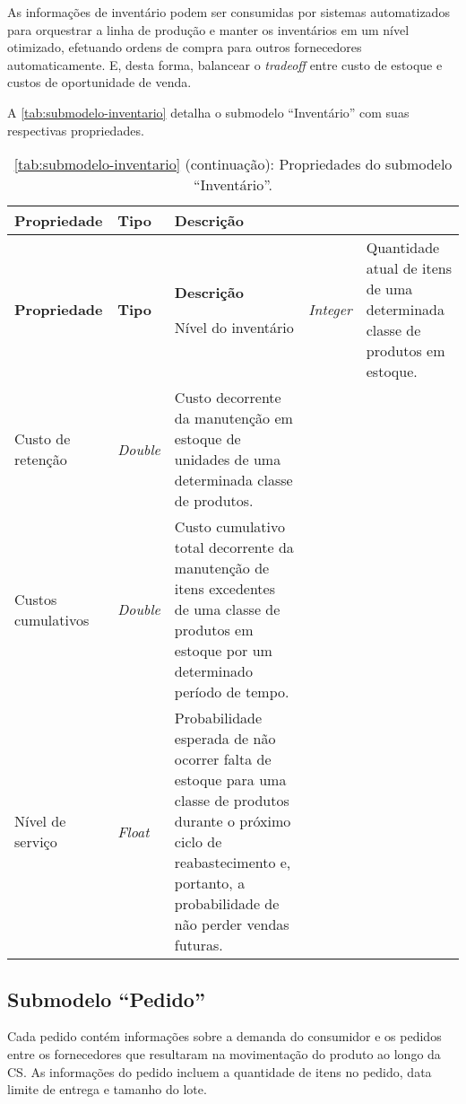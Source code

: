 As informações de inventário podem ser consumidas por sistemas automatizados para orquestrar a linha de produção e manter os inventários em um nível otimizado, efetuando ordens de compra para outros fornecedores automaticamente. E, desta forma, balancear o \textit{tradeoff} entre custo de estoque e custos de oportunidade de venda.

A \autoref{tab:submodelo-inventario} detalha o submodelo ``Inventário'' com suas respectivas propriedades.

\begin{longtable}{|p{}|p{}|p{}|}

	\caption{\label{tab:submodelo-inventario} Propriedades do submodelo ``Inventário''.}
	\\ \hline \textbf{Propriedade} & \textbf{Tipo} & \textbf{Descrição}
	\endfirsthead

	\caption*{\autoref{tab:submodelo-inventario} (continuação): Propriedades do submodelo ``Inventário''.}
	\\ \hline \textbf{Propriedade} & \textbf{Tipo}    & \textbf{Descrição}
	\endhead

	\hline Nível do inventário & \textit{Integer} & Quantidade atual de itens de uma determinada classe de produtos em estoque.

	\\ \hline Custo de retenção & \textit{Double} & Custo decorrente da manutenção em estoque de unidades de uma determinada classe de produtos.

	\\ \hline Custos cumulativos & \textit{Double} & Custo cumulativo total decorrente da manutenção de itens excedentes de uma classe de produtos em estoque por um determinado período de tempo.

	\\ \hline Nível de serviço & \textit{Float} & Probabilidade esperada de não ocorrer falta de estoque para uma classe de produtos durante o próximo ciclo de reabastecimento e, portanto, a probabilidade de não perder vendas futuras.

	\\ \hline
\end{longtable}

\subsection{Submodelo ``Pedido''}

Cada pedido contém informações sobre a demanda do consumidor e os pedidos entre os fornecedores que resultaram na movimentação do produto ao longo da CS. As informações do pedido incluem a quantidade de itens no pedido, data limite de entrega e tamanho do lote.

